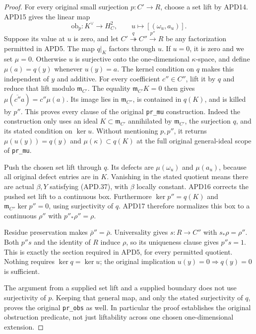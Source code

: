 \documentclass[11pt,a4paper]{article}
\numberwithin{equation}{section}
\theoremstyle{remark}\newtheorem{remark}[theorem]{Remark}
\begin{document}
\begin{proof}
For every original small surjection \(p:C'\to R\), choose
a set lift by APD14.  APD15 gives the linear map
\[
 \mathrm{ob}_p:K^\vee\longrightarrow H_C^2,
 \qquad u\longmapsto[(\omega_u,a_u)].                     \tag{APD.38}
\]
Suppose its value at \(u\) is zero, and let
\(C'\overset q\twoheadrightarrow C''\overset{p''}\to R\)
be any factorization permitted in APD5.  The map \(q|_K\)
factors through \(u\).  If \(u=0\), it is zero and we set
\(\mu=0\).  Otherwise \(u\) is surjective onto the
one-dimensional \(\kappa\)-space, and define
\(\mu(a)=q(y)\) whenever \(u(y)=a\).  The kernel condition
on \(q\) makes this independent of \(y\) and additive.
For every coefficient \(c''\in C''\), lift it by \(q\)
and reduce that lift modulo \(\mathfrak m_{C'}\).
The equality \(\mathfrak m_{C'}K=0\) then gives
\(\mu(\overline{c''}a)=c''\mu(a)\).
Its image lies in \(\mathfrak m_{C''}\), is contained in
\(q(K)\), and is killed by \(p''\).  This proves every
clause of the original \texttt{pr\_\allowbreak mu} construction.
Indeed the construction only uses an ideal
\(K\subset\mathfrak m_{C'}\) annihilated by
\(\mathfrak m_{C'}\), the surjection \(q\), and its stated
condition on \(\ker u\).  Without mentioning \(p,p''\), it
returns \(\mu(u(y))=q(y)\) and
\(\mu(\kappa)\subset q(K)\) at the full original general-ideal
scope of \texttt{pr\_\allowbreak mu}.

Push the chosen set lift through \(q\).  Its defects are
\(\mu(\omega_u)\) and \(\mu(a_u)\), because all original
defect entries are in \(K\).  Vanishing in the stated quotient
means there are actual \(\beta,Y\) satisfying (APD.37), with
\(\beta\) locally constant.  APD16 corrects the pushed set
lift to a continuous box.  Furthermore
\(\ker p''=q(K)\) and
\(\mathfrak m_{C''}\ker p''=0\), using surjectivity of \(q\).
APD17 therefore normalizes this box to a continuous
\(\rho''\) with \(p''_*\rho''=\rho\).

Residue preservation makes \(\bar\rho''=\bar\rho\).
Universality gives \(s:R\to C''\) with \(s_*\rho=\rho''\).
Both \(p''s\) and the identity of \(R\) induce \(\rho\),
so its uniqueness clause gives \(p''s=1\).  This is exactly
the section required in APD5, for every permitted quotient.
Nothing requires \(\ker q=\ker u\); the original implication
\(u(y)=0\Rightarrow q(y)=0\) is sufficient.

The argument from a supplied set lift and a supplied boundary
does not use surjectivity of \(p\).  Keeping that general map,
and only the stated surjectivity of \(q\), proves the original
\texttt{pr\_\allowbreak obs} as well.  In particular the proof establishes
the original obstruction predicate, not just liftability across
one chosen one-dimensional extension.
\end{proof}
\end{document}
